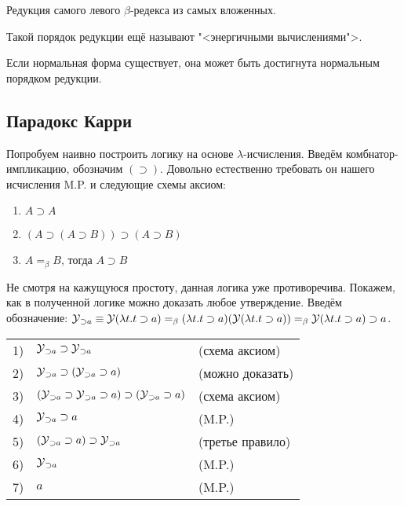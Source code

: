 \begin{definition}
    Редукция самого левого $\beta$-редекса из самых вложенных.
\end{definition}
Такой порядок редукции ещё называют "<энергичными вычислениями">.

\begin{statement}
    Если нормальная форма существует, она может быть достигнута нормальным порядком редукции.
\end{statement}

\subsection{\texorpdfstring{Парадокс Карри}{Curry's paradox}}

Попробуем наивно построить логику на основе $\lambda$-исчисления.
Введём комбнатор-импликацию, обозначим $(\supset)$.
Довольно естественно требовать он нашего исчисления M.P. и следующие схемы аксиом:
\begin{enumerate}
    \item $A \supset A$
    \item $(A \supset (A \supset B)) \supset (A \supset B)$
    \item $A =_{\beta} B$, тогда $A \supset B$
\end{enumerate}

Не смотря на кажущуюся простоту, данная логика уже противоречива.
Покажем, как в полученной логике можно доказать любое утверждение.
Введём обозначение: $\operatorname{\mathcal{Y}}_{\supset a} \equiv \operatorname{\mathcal{Y}} (\lambda t . t \supset a)
=_\beta (\lambda t . t \supset a) (\operatorname{\mathcal{Y}} (\lambda t . t \supset a))
=_{\beta} \operatorname{\mathcal{Y}} (\lambda t . t \supset a) \supset a$.

\begin{tabular}{lll}
    1) & $\operatorname{\mathcal{Y}}_{\supset a} \supset \operatorname{\mathcal{Y}}_{\supset a}$ & (схема аксиом) \\
    2) & $\operatorname{\mathcal{Y}}_{\supset a} \supset (\operatorname{\mathcal{Y}}_{\supset a} \supset a)$ & (можно доказать) \\
    3) & $(\operatorname{\mathcal{Y}}_{\supset a} \supset \operatorname{\mathcal{Y}}_{\supset a} \supset a) \supset (\operatorname{\mathcal{Y}}_{\supset a} \supset a)$ & (схема аксиом) \\
    4) & $\operatorname{\mathcal{Y}}_{\supset a} \supset a$ & (M.P.) \\
    5) & $(\operatorname{\mathcal{Y}}_{\supset a} \supset a) \supset \operatorname{\mathcal{Y}}_{\supset a}$ & (третье правило) \\
    6) & $\operatorname{\mathcal{Y}}_{\supset a}$ & (M.P.) \\
    7) & $a$ & (M.P.)
\end{tabular}

